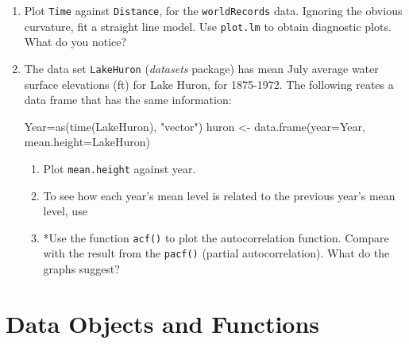 \documentclass{tufte-book}\usepackage[]{graphicx}\usepackage[]{color}
\newcommand{\txtt}[1]{\texttt{#1}}
\begin{document}
\begin{enumerate}

\item Plot \txtt{Time} against \txtt{Distance}, for the
  \txtt{worldRecords} data.  Ignoring the obvious curvature, fit a
  straight line model. Use \txtt{plot.lm} to obtain diagnostic
  plots.  What do you notice?
\item The data set \txtt{LakeHuron} (\textit{datasets} package) has
  mean July average water surface elevations (ft) for Lake Huron, for
  1875-1972. The following reates a data frame that has the
  same information:
\begin{Schunk}
\begin{Sinput}
Year=as(time(LakeHuron), "vector")
huron <- data.frame(year=Year, mean.height=LakeHuron)
\end{Sinput}
\end{Schunk}
\begin{enumerate}
\item Plot \txtt{mean.height} against year.

\item To see how each year's mean level is related
to the previous year's mean level, use
\begin{Schunk}
\end{Schunk}

\item *Use the function \txtt{acf()} to plot the autocorrelation
function.  Compare with the result from the \txtt{pacf()} (partial
autocorrelation).  What do the graphs suggest?
\end{enumerate}
\end{enumerate}
\cleartooddpage

\chapter{Data Objects and Functions}





\end{document}
